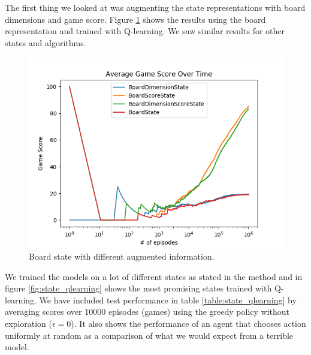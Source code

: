 \documentclass[result.tex]{subfiles}
\begin{document}
    The first thing we looked at was augmenting the state representations with board dimensions and game score. Figure \ref{fig:info_augmentation_board_state} shows the results using the board representation and trained with Q-learning. We saw similar results for other states and algorithms.

    \begin{figure}[ht]
        \centering
        \includegraphics[width=\linewidth]{../images/qlearning/info_augmentation/123/board_state_average_game_score_over_time.png}
        \caption{Board state with different augmented information.}
        \label{fig:info_augmentation_board_state}
    \end{figure}

    \newpage

    We trained the models on a lot of different states as stated in the method and in figure \ref{fig:state_qlearning} shows the most promising states trained with Q-learning. We have included test performance in table \ref{table:state_qlearning} by averaging scores over 10000 episodes (games) using the greedy policy without exploration ($\epsilon = 0$). It also shows the performance of an agent that chooses action uniformly at random as a comparison of what we would expect from a terrible model.
\end{document}

